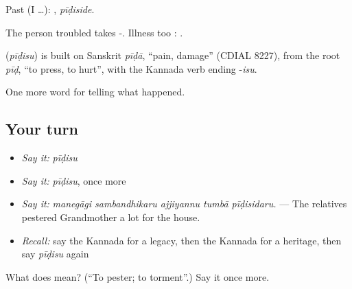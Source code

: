 Past (I …): , \emph{pīḍiside}.

The person troubled takes -. Illness too :  .

\begin{cousinweb}
\textbf{} (\emph{pīḍisu}) is built on Sanskrit \emph{pīḍā}, \textquotedblleft{}pain, damage\textquotedblright{} (CDIAL 8227), from the root \emph{pīḍ}, \textquotedblleft{}to press, to hurt\textquotedblright{}, with the Kannada verb ending -\emph{isu}.
\end{cousinweb}

\begin{grammarlens}[title={What you've built}]
One more word for telling what happened.
\end{grammarlens}

\subsection*{Your turn}
\begin{itemize}
\raggedright
  \item \emph{Say it:} \emph{pīḍisu}
  \item \emph{Say it:} \emph{pīḍisu}, once more
  \item \emph{Say it:} \emph{manegāgi sambandhikaru ajjiyannu tumbā pīḍisidaru.} — The relatives pestered Grandmother a lot for the house.
  \item \emph{Recall:} say the Kannada for a legacy, then the Kannada for a heritage, then say \emph{pīḍisu} again
\end{itemize}

\begin{tcolorbox}[breakable,colback=teal!4,colframe=teal!35!black,title={Before you move on}]
What does  mean? (\textquotedblleft{}To pester; to torment\textquotedblright{}.) Say it once more.
\end{tcolorbox}
